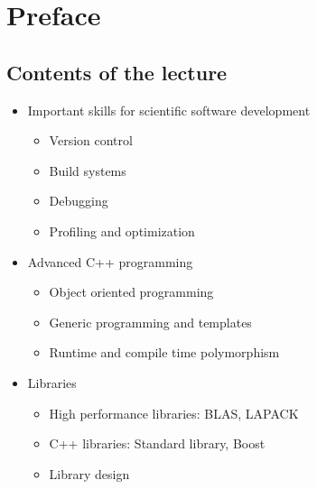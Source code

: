 \chapter{Preface}
\section{Contents of the lecture}	
\begin{itemize}
	\item Important skills for scientific software development
		\begin{itemize}
			\item Version control
			\item Build systems
			\item Debugging
			\item Profiling and optimization
		\end{itemize}
	\item  Advanced C++ programming
		\begin{itemize}
			\item Object oriented programming
			\item Generic programming and templates
			\item Runtime and compile time polymorphism
		\end{itemize}
	\item  Libraries
		\begin{itemize}
			\item High performance libraries: BLAS, LAPACK
			\item C++ libraries: Standard library, Boost
			\item Library design
		\end{itemize}
\end{itemize}
